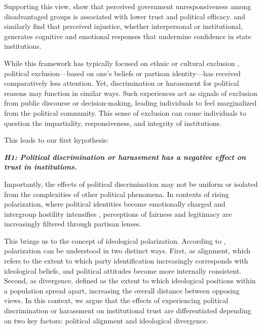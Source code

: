 \documentclass{article}
\begin{document}
Supporting this view, \textcite{levi_legitimating_2009} show that perceived government unresponsiveness among disadvantaged groups is associated with lower trust and political efficacy. \textcite{anderson_corruption_2003} and \textcite{oskooii_perceived_2020} similarly find that perceived injustice, whether interpersonal or institutional, generates cognitive and emotional responses that undermine confidence in state institutions.

While this framework has typically focused on ethnic or cultural exclusion \parencite{oskooii_perceived_2020, wilkes_immigration_2019, tyrberg_impact_2024}, political exclusion—based on one's beliefs or partisan identity—has received comparatively less attention. Yet, discrimination or harassment for political reasons may function in similar ways. Such experiences act as signals of exclusion from public discourse or decision-making, leading individuals to feel marginalized from the political community. This sense of exclusion can cause individuals to question the impartiality, responsiveness, and integrity of institutions.

This leads to our first hypothesis:

\emph{\textbf{\small
H1: Political discrimination or harassment has a negative effect on trust in institutions.
}}

Importantly, the effects of political discrimination may not be uniform or isolated from the complexities of other political phenomena. In contexts of rising polarization, where political identities become emotionally charged and intergroup hostility intensifies \parencite{iyengar_origins_2019, mccoy_polarization_2018}, perceptions of fairness and legitimacy are increasingly filtered through partisan lenses.

This brings us to the concept of ideological polarization. According to \textcite{lelkes_limits_2017}, polarization can be understood in two distinct ways. First, as alignment, which refers to the extent to which party identification increasingly corresponds with ideological beliefs, and political attitudes become more internally consistent. Second, as divergence, defined as the extent to which ideological positions within a population spread apart, increasing the overall distance between opposing views. In this context, we argue that the effects of experiencing political discrimination or harassment on institutional trust are differentiated depending on two key factors: political alignment and ideological divergence. 
\end{document}
